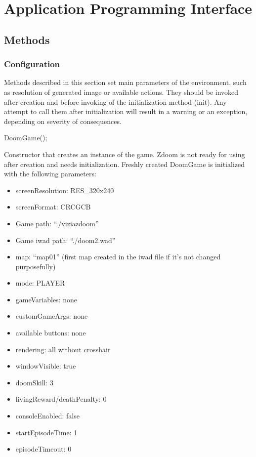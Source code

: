 \chapter{Application Programming Interface}\label{ch:api}
\section{Methods}\label{sec:methods}
	\subsection{Configuration}\label{subsec:config_methods}
	Methods described in this section set main parameters of the environment, such as resolution of generated image or available actions. They should be invoked after creation and before invoking of the initialization method (init). Any attempt to call them after initialization will result in a warning or an exception, depending on severity of consequences. 
	\vspace{20pt}

\begin{clinee}
DoomGame();
\end{clinee}

Constructor that creates an instance of the game. Zdoom is not ready for using after creation and needs initialization. Freshly created DoomGame is initialized with the following parameters:
	\begin{itemize}
		\item screenResolution: RES\_320x240
		\item screenFormat: CRCGCB
		\item Game path: ``./viziazdoom''
		\item Game iwad path: ``./doom2.wad''
		\item map: ``map01'' (first map created in the iwad file if it's not changed purposefully)
		\item mode: PLAYER
		\item gameVariables: none
		\item customGameArgs: none
		\item available buttons: none
		\item rendering: all without crosshair
		\item windowVisible: true 
		\item doomSkill: 3
		\item livingReward/deathPenalty: 0
		\item consoleEnabled: false
		\item startEpisodeTime: 1
		\item episodeTimeout: 0
	\end{itemize}


